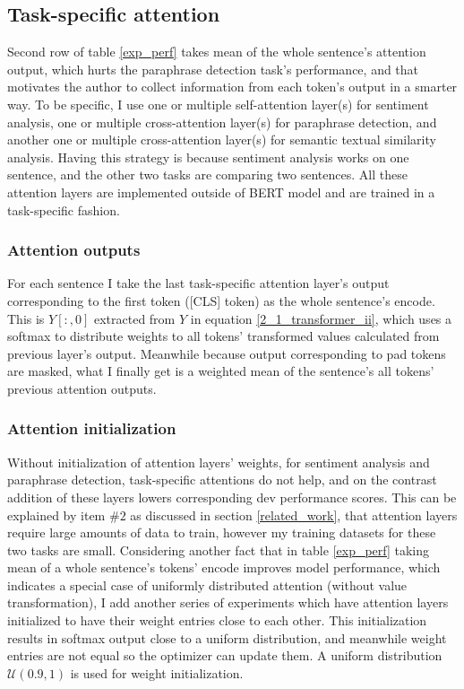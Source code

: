 \documentclass{article}
\begin{document}
\subsection{Task-specific attention}
\label{attn}

Second row of table \ref{exp_perf} takes mean of the whole sentence's attention output, which hurts the paraphrase detection task's performance, and that motivates the author to collect information from each token's output in a smarter way. To be specific, I use one or multiple self-attention layer(s) for sentiment analysis, one or multiple cross-attention layer(s) for paraphrase detection, and another one or multiple cross-attention layer(s) for semantic textual similarity analysis. Having this strategy is because sentiment analysis works on one sentence, and the other two tasks are comparing two sentences. All these attention layers are implemented outside of BERT model and are trained in a task-specific fashion.   

\subsubsection{Attention outputs}
\label{attn_output}
For each sentence I take the last task-specific attention layer's output corresponding to the first token ([CLS] token) as the whole sentence's encode. This is $Y[:, 0]$ extracted from $Y$ in equation \ref{2_1_transformer_ii}, which uses a softmax to distribute weights to all tokens' transformed values calculated from previous layer's output. Meanwhile because output corresponding to pad tokens are masked, what I finally get is a weighted mean of the sentence's all tokens' previous attention outputs.

\subsubsection{Attention initialization}
\label{attn_init}
Without initialization of attention layers' weights, for sentiment analysis and paraphrase detection, task-specific attentions do not help, and on the contrast addition of these layers lowers corresponding dev performance scores. This can be explained by item $\#2$ as discussed in section \ref{related_work}, that attention layers require large amounts of data to train, however my training datasets for these two tasks are small. Considering another fact that in table \ref{exp_perf} taking mean of a whole sentence's tokens' encode improves model performance, which indicates a special case of uniformly distributed attention (without value transformation), I add another series of experiments which have attention layers initialized to have their weight entries close to each other. This initialization results in softmax output close to a uniform distribution, and meanwhile weight entries are not equal so the optimizer can update them. A uniform distribution $\mathcal{U}(0.9, 1)$ is used for weight initialization.
\end{document}
